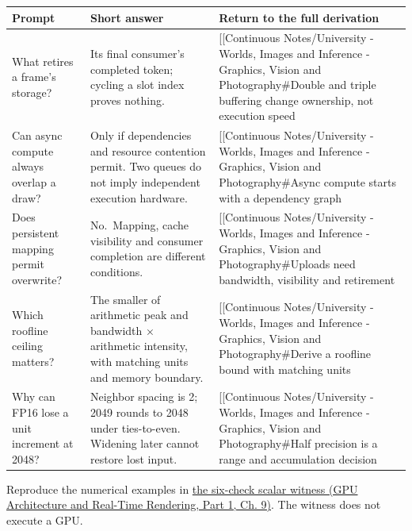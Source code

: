 \hypertarget{appendix-a8f634b076b5-buffering-budget-and-precision-in-five-answers}{}

{\def\LTcaptype{none} %
\begin{longtable}[]{@{}
  >{\raggedright\arraybackslash}p{}
  >{\raggedright\arraybackslash}p{}
  >{\raggedright\arraybackslash}p{}@{}}
\toprule\noalign{}
\begin{minipage}[b]{\linewidth}\raggedright
Prompt
\end{minipage} & \begin{minipage}[b]{\linewidth}\raggedright
Short answer
\end{minipage} & \begin{minipage}[b]{\linewidth}\raggedright
Return to the full derivation
\end{minipage} \\
\midrule\noalign{}
\endhead
\bottomrule\noalign{}
\endlastfoot
What retires a frame's storage? & Its final consumer's completed token; cycling a slot index proves nothing. & {[}{[}Continuous Notes/University - Worlds, Images and Inference - Graphics, Vision and Photography\#Double and triple buffering change ownership, not execution speed \\
Can async compute always overlap a draw? & Only if dependencies and resource contention permit. Two queues do not imply independent execution hardware. & {[}{[}Continuous Notes/University - Worlds, Images and Inference - Graphics, Vision and Photography\#Async compute starts with a dependency graph \\
Does persistent mapping permit overwrite? & No.~Mapping, cache visibility and consumer completion are different conditions. & {[}{[}Continuous Notes/University - Worlds, Images and Inference - Graphics, Vision and Photography\#Uploads need bandwidth, visibility and retirement \\
Which roofline ceiling matters? & The smaller of arithmetic peak and bandwidth × arithmetic intensity, with matching units and memory boundary. & {[}{[}Continuous Notes/University - Worlds, Images and Inference - Graphics, Vision and Photography\#Derive a roofline bound with matching units \\
Why can FP16 lose a unit increment at 2048? & Neighbor spacing is 2; 2049 rounds to 2048 under ties-to-even. Widening later cannot restore lost input. & {[}{[}Continuous Notes/University - Worlds, Images and Inference - Graphics, Vision and Photography\#Half precision is a range and accumulation decision \\
\end{longtable}
}

Reproduce the numerical examples in \href{../06-GPU-Architecture-and-Real-Time-Rendering-P01/main.pdf\#nameddest=03-visual-computing-i-ch016-check-the-scheduling-and-precision-examples-with-a-scalar-witness}{the six-check scalar witness (GPU Architecture and Real-Time Rendering, Part 1, Ch. 9)}. The witness does not execute a GPU.
